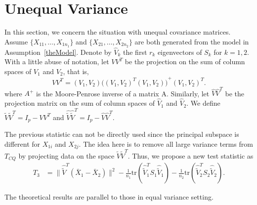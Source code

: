 \documentclass[review]{elsarticle}
\theoremstyle{plain}
\theoremstyle{definition}
\theoremstyle{remark}
\begin{document}
\section{Unequal Variance}

In this section, we concern the situation with unequal covariance matrices.
Assume $\{X_{11},\ldots, X_{1n_1}\}$ and $\{X_{21},\ldots, X_{2n_2}\}$ are both generated from the model in Assumption~\ref{theModel}.
Denote by $\hat{V}_k$ the first $r_k$ eigenvectors of $S_k$ for $k=1,2$.
With a little abuse of notation, let $VV^T$ be the projection on the sum of column spaces of $V_1$ and $V_2$, that is,
\begin{equation*}
    VV^T =(V_1,V_2){\big({(V_1,V_2)}^T (V_1,V_2)\big)}^{+}{(V_1,V_2)}^T.
\end{equation*}
where $A^{+}$ is the Moore-Penrose inverse of a matrix A. Similarly, let $\hat{V}\hat{V}^T$ be the projection matrix on the sum of column spaces of $\hat{V}_1$ and $\hat{V}_2$.
 We define $\tilde{V}\tilde{V}^T=I_{p}-VV^T$ and $\hat{\tilde{V}}\hat{\tilde{V}}^T=I_{p}-\hat{V}\hat{V}^T$. 

The previous statistic can not be directly used
since the principal subspace is different for $X_{1i}$ and $X_{2j}$. The idea here is to remove all large variance terms from $T_{CQ}$ by projecting data on the space $\tilde{V}\tilde{V}^T$. Thus, we propose a new test statistic as
\begin{equation*}
\begin{aligned}
    T_3&=\|\hat{\tilde{V}}^T(\bar{X}_1-\bar{X}_2)\|^2-\frac{1}{n_1}\mathrm{tr}(\hat{\tilde{V}}_1^T S_1\hat{\tilde{V}}_1)-\frac{1}{n_2}\mathrm{tr}(\hat{\tilde{V}}_2^T S_2\hat{\tilde{V}}_2).
\end{aligned}
\end{equation*}


The theoretical results are parallel to those in equal variance setting.

\end{document}
